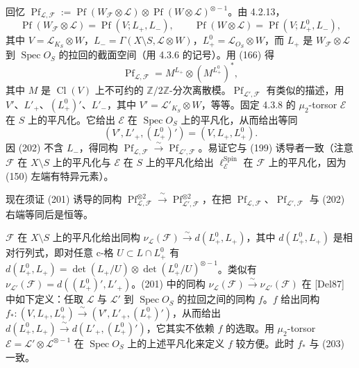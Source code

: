 回忆 $\operatorname{Pf}_{\mathcal{L},\mathcal{F}}:=\operatorname{Pf}(W_{\mathcal{F}}\otimes\mathcal{L})\otimes\operatorname{Pf}(W\otimes\mathcal{L})^{\otimes-1}$。由 4.2.13，
\[
\operatorname{Pf}(W_{\mathcal{F}}\otimes\mathcal{L})=\operatorname{Pf}(V;L_{+},L_{-}),\qquad
\operatorname{Pf}(W\otimes\mathcal{L})=\operatorname{Pf}(V;L_{+}^{0},L_{-}),
\]
其中 $V=\mathcal{L}_{K_{S}}\otimes W$，$L_{-}=\Gamma(X\setminus S,\mathcal{L}\otimes W)$，$L_{+}^{0}=\mathcal{L}_{O_{S}}\otimes W$，而 $L_{+}$ 是 $W_{\mathcal{F}}\otimes\mathcal{L}$ 到 $\operatorname{Spec} O_{S}$ 的拉回的截面空间（用 4.3.6 的记号）。用 (166) 得
\begin{equation}\tag{202}
\operatorname{Pf}_{\mathcal{L},\mathcal{F}}=M^{L_{+}}\otimes(M^{L_{+}^{0}})^{*},
\end{equation}
其中 $M$ 是 $\operatorname{Cl}(V)$ 上不可约的 $\mathbb{Z}/2\mathbb{Z}$-分次离散模。$\operatorname{Pf}_{\mathcal{L}',\mathcal{F}}$ 有类似的描述，用 $V'$、$L'_{+}$、$(L_{+}^{0})'$、$L'_{-}$，其中 $V'=\mathcal{L}'_{K_{S}}\otimes W$，等等。固定 4.3.8 的 $\mu_{2}$-torsor $\mathcal{E}$ 在 $S$ 上的平凡化。它给出 $\mathcal{E}$ 在 $\operatorname{Spec} O_{S}$ 上的平凡化，从而给出等同
\begin{equation}\tag{203}
(V',L'_{+},(L_{+}^{0})')=(V,L_{+},L_{+}^{0}).
\end{equation}
因 (202) 不含 $L_{-}$，得同构 $\operatorname{Pf}_{\mathcal{L},\mathcal{F}}\xrightarrow{\ \sim\ }\operatorname{Pf}_{\mathcal{L}',\mathcal{F}}$。易证它与 (199) 诱导者一致（注意 $\mathcal{F}$ 在 $X\setminus S$ 上的平凡化与 $\mathcal{E}$ 在 $S$ 上的平凡化给出 $\ell^{\operatorname{Spin}}_{\mathcal{E}}$ 在 $\mathcal{F}$ 上的平凡化，因为 (150) 左端有特异元素）。

现在须证 (201) 诱导的同构 $\operatorname{Pf}_{\mathcal{L},\mathcal{F}}^{\otimes 2}\xrightarrow{\ \sim\ }\operatorname{Pf}_{\mathcal{L}',\mathcal{F}}^{\otimes 2}$，在把 $\operatorname{Pf}_{\mathcal{L},\mathcal{F}}$、$\operatorname{Pf}_{\mathcal{L}',\mathcal{F}}$ 与 (202) 右端等同后是恒等。

$\mathcal{F}$ 在 $X\setminus S$ 上的平凡化给出同构 $\nu_{\mathcal{L}}(\mathcal{F})\xrightarrow{\ \sim\ }d(L_{+}^{0},L_{+})$，其中 $d(L_{+}^{0},L_{+})$ 是相对行列式，即对任意 c-格 $U\subset L\cap L_{+}^{0}$ 有 $d(L_{+}^{0},L_{+})=\det(L_{+}/U)\otimes\det(L_{+}^{0}/U)^{\otimes-1}$。类似有 $\nu_{\mathcal{L}'}(\mathcal{F})=d((L_{+}^{0})',L'_{+})$。(201) 中的同构 $\nu_{\mathcal{L}}(\mathcal{F})\xrightarrow{\ \sim\ }\nu_{\mathcal{L}'}(\mathcal{F})$ 在 [Del87] 中如下定义：任取 $\mathcal{L}$ 与 $\mathcal{L}'$ 到 $\operatorname{Spec} O_{S}$ 的拉回之间的同构 $f$。$f$ 给出同构 $f_{*}:(V,L_{+},L_{+}^{0})\xrightarrow{\ \sim\ }(V',L'_{+},(L_{+}^{0})')$，从而给出 $d(L_{+}^{0},L_{+})\xrightarrow{\ \sim\ }d(L'_{+},(L_{+}^{0})')$，它其实不依赖 $f$ 的选取。用 $\mu_{2}$-torsor $\mathcal{E}=\mathcal{L}'\otimes\mathcal{L}^{\otimes-1}$ 在 $\operatorname{Spec} O_{S}$ 上的上述平凡化来定义 $f$ 较方便。此时 $f_{*}$ 与 (203) 一致。

